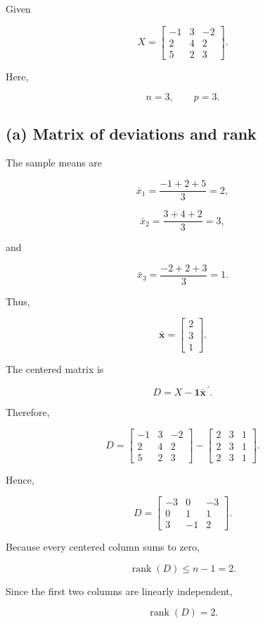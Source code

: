 \documentclass{article}
\begin{document}
Given

\[
X=
\begin{bmatrix}
-1&3&-2\\
2&4&2\\
5&2&3
\end{bmatrix}.
\]

Here,

\[
n=3,\qquad p=3.
\]

\subsection*{(a) Matrix of deviations and rank}

The sample means are

\[
\bar{x}_1
=
\frac{-1+2+5}{3}
=
2,
\]

\[
\bar{x}_2
=
\frac{3+4+2}{3}
=
3,
\]

and

\[
\bar{x}_3
=
\frac{-2+2+3}{3}
=
1.
\]

Thus,

\[
\bar{\mathbf x}
=
\begin{bmatrix}
2\\3\\1
\end{bmatrix}.
\]

The centered matrix is

\[
D=X-\mathbf1\bar{\mathbf x}^{\,\prime}.
\]

Therefore,

\[
D=
\begin{bmatrix}
-1&3&-2\\
2&4&2\\
5&2&3
\end{bmatrix}
-
\begin{bmatrix}
2&3&1\\
2&3&1\\
2&3&1
\end{bmatrix}.
\]

Hence,

\[
\boxed{
D=
\begin{bmatrix}
-3&0&-3\\
0&1&1\\
3&-1&2
\end{bmatrix}}.
\]

Because every centered column sums to zero,

\[
\operatorname{rank}(D)\leq n-1=2.
\]

Since the first two columns are linearly independent,

\[
\boxed{\operatorname{rank}(D)=2}.
\]
\end{document}

